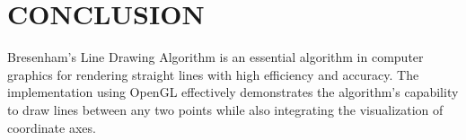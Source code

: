\documentclass{article}
\begin{document}
\section*{CONCLUSION}
Bresenham's Line Drawing Algorithm is an essential algorithm in computer graphics for rendering straight lines with high efficiency and accuracy. The implementation using OpenGL effectively demonstrates the algorithm's capability to draw lines between any two points while also integrating the visualization of coordinate axes.
\end{document}
